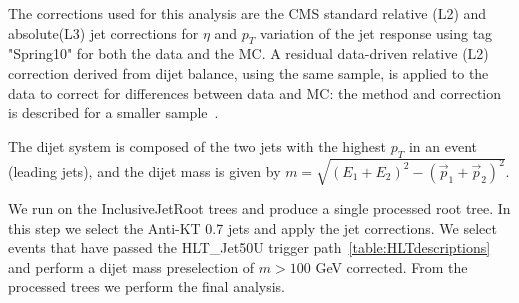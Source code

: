 The corrections used for this analysis are the CMS standard relative (L2) and 
absolute(L3) jet 
corrections for $\eta$ and $p_T$ variation of the jet response using  
tag "Spring10" for both the data and the MC. A residual data-driven relative
(L2) correction derived from dijet balance, using the same sample, is applied 
to the data to correct for differences between data and MC: the method and 
correction is described for a smaller sample~\cite{PAS_JME_10-003, CMS_AN_2010/139}.

The dijet system is composed of the
two jets with the highest $p_T$ in an event (leading jets),
and the dijet mass is given by
$m=\sqrt{(E_1 + E_2)^2 - (\vec{p}_1 + \vec{p}_2)^2}$.

We run on the InclusiveJetRoot trees and produce a single processed root tree.
In this step we select the Anti-KT 0.7 jets and apply the jet corrections.  
We select events that have passed the HLT\_Jet50U trigger path~\ref{table:HLTdescriptions} and perform a dijet mass preselection
of $m>100$ GeV corrected. 
From the processed trees we perform the final analysis.  

